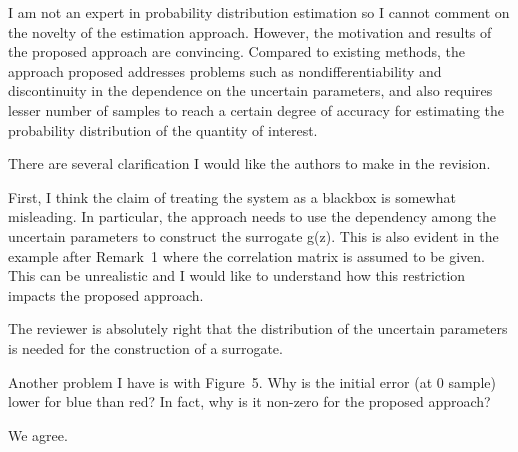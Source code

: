 \begin{reviewer}
I am not an expert in probability distribution estimation so I cannot comment on
the novelty of the estimation approach. However, the motivation and results of
the proposed approach are convincing. Compared to existing methods, the approach
proposed addresses problems such as nondifferentiability and discontinuity in
the dependence on the uncertain parameters, and also requires lesser number of
samples to reach a certain degree of accuracy for estimating the probability
distribution of the quantity of interest.

There are several clarification I would like the authors to make in the
revision.

First, I think the claim of treating the system as a blackbox is somewhat
misleading. In particular, the approach needs to use the dependency among the
uncertain parameters to construct the surrogate g(z). This is also evident in
the example after Remark~1 where the correlation matrix is assumed to be given.
This can be unrealistic and I would like to understand how this restriction
impacts the proposed approach.
\end{reviewer}

\begin{authors}
The reviewer is absolutely right that the distribution of the uncertain
parameters is needed for the construction of a surrogate.

\begin{actions}
\end{actions}
\end{authors}

\begin{reviewer}
Another problem I have is with Figure~5. Why is the initial error (at 0 sample)
lower for blue than red? In fact, why is it non-zero for the proposed approach?
\end{reviewer}

\begin{authors}
We agree.

\begin{actions}
\end{actions}
\end{authors}
